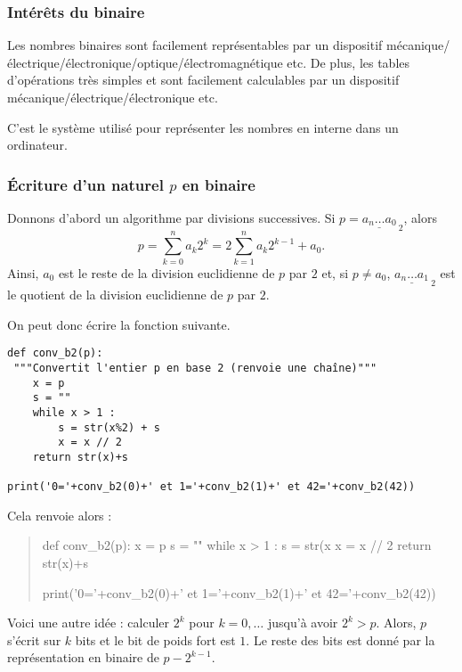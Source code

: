 \subsubsection{Intérêts du binaire}
Les nombres binaires sont facilement représentables par un dispositif
  mécanique/électrique/électronique/optique/électromagnétique etc.
De plus, les tables d'opérations très simples et sont facilement calculables par un
  dispositif mécanique/électrique/électronique etc.

C'est le système utilisé pour représenter les nombres en interne dans
un ordinateur.

\subsubsection{Écriture d'un naturel $p$ en binaire}

Donnons d'abord un algorithme par divisions successives.
Si $p = \underline{a_n\dots a_0}_{~2}$, alors 
$$ p = \sum_{k=0}^n a_k 2^k = 2\sum_{k=1}^n a_k2^{k-1} + a_0.$$
Ainsi, $a_0$ est le reste de la division euclidienne de $p$ par $2$ et, si $p\neq a_0$, $\underline{a_n\dots a_1}_{~2}$ est le quotient de la division euclidienne de $p$ par $2$.

On peut donc écrire la fonction suivante.



\begin{lstlisting}
def conv_b2(p):
 """Convertit l'entier p en base 2 (renvoie une chaîne)"""
    x = p
    s = ""
    while x > 1 :
        s = str(x%2) + s
        x = x // 2
    return str(x)+s

print('0='+conv_b2(0)+' et 1='+conv_b2(1)+' et 42='+conv_b2(42))
\end{lstlisting}



Cela renvoie alors :
\begin{quote}
\begin{pycode}
def conv_b2(p):
    x = p
    s = ""
    while x > 1 :
        s = str(x%
        x = x // 2
    return str(x)+s

print('0='+conv_b2(0)+' et 1='+conv_b2(1)+' et 42='+conv_b2(42))
\end{pycode}
\end{quote}


Voici une autre idée : calculer $2^{k}$ pour $k=0, \ldots$ jusqu'à avoir $2^{k} >
  p$. Alors, $p$ s'écrit sur $k$ bits et le bit de poids fort est
  $1$. Le reste des bits est donné par la représentation en binaire de
  $p-2^{k-1}$.


